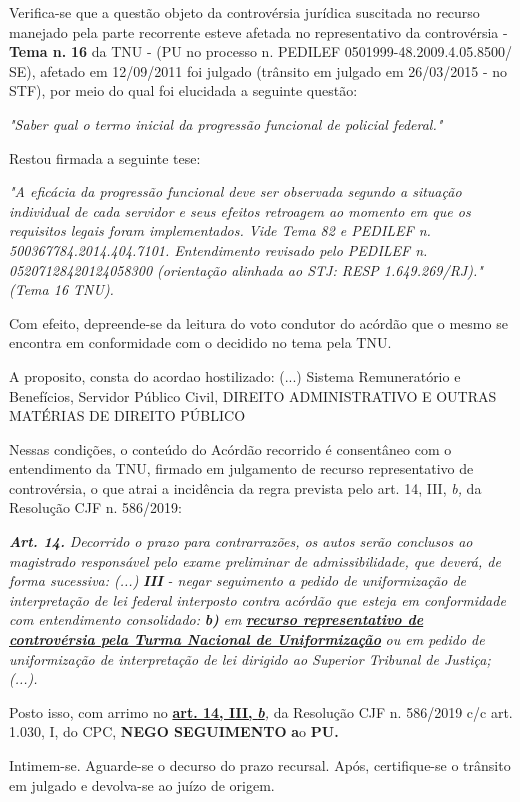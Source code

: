 \documentclass[12pt]{article}
\begin{document}
\justifying
\noindent Verifica-se que a questão objeto da controvérsia jurídica suscitada no recurso manejado pela parte recorrente esteve afetada no representativo da controvérsia - \textbf{Tema n. }\textbf{16} da TNU - (PU no processo n. PEDILEF 0501999-48.2009.4.05.8500/ SE),  afetado em 12/09/2011 foi julgado (trânsito em julgado em 26/03/2015 - no STF), por meio do qual foi elucidada a seguinte questão:

\noindent \textit{"Saber qual o termo inicial da progressão funcional de policial federal."}

\noindent Restou firmada a seguinte tese:

\noindent \textit{"A eficácia da progressão funcional deve ser observada segundo a situação individual de cada servidor e seus efeitos retroagem ao momento em que os requisitos legais foram implementados. Vide Tema 82 e PEDILEF n. 500367784.2014.404.7101. Entendimento revisado pelo PEDILEF n. 05207128420124058300 (orientação alinhada ao STJ: RESP 1.649.269/RJ)." (Tema 16 TNU).}

\noindent Com efeito, depreende-se da leitura do voto condutor do acórdão que o mesmo se encontra em conformidade com o decidido no  tema pela TNU.

\noindent A proposito, consta do acordao hostilizado: (...) Sistema Remuneratório e Benefícios, Servidor Público Civil, DIREITO ADMINISTRATIVO E OUTRAS MATÉRIAS DE DIREITO PÚBLICO

\noindent Nessas condições, o conteúdo do Acórdão recorrido é consentâneo com o entendimento da TNU, firmado em julgamento de recurso representativo de controvérsia, o que atrai a incidência da regra prevista pelo art. 14, III, \textit{b,} da Resolução CJF n. 586/2019:

\noindent \textit{\textbf{Art. 14.}}\textit{ Decorrido o prazo para contrarrazões, os autos serão conclusos ao magistrado responsável pelo exame preliminar de admissibilidade, que deverá, de forma sucessiva: (...) }\textit{\textbf{III }}\textit{- negar seguimento a pedido de uniformização de interpretação de lei federal interposto contra acórdão que esteja em conformidade com entendimento consolidado: }\textit{\textbf{b)}}\textit{ em }\uline{\textit{\textbf{recurso representativo de controvérsia pela Turma Nacional de Uniformização}}}\textit{ ou em pedido de uniformização de interpretação de lei dirigido ao Superior Tribunal de Justiça;(...).}

\noindent Posto isso, com arrimo no \uline{\textbf{art. 14, III, }}\uline{\textit{\textbf{b}}}\textit{,} da Resolução CJF n. 586/2019 c/c art. 1.030, I, do CPC, \textbf{NEGO SEGUIMENTO }\textbf{a}o\textbf{ PU}\textbf{.}

\noindent Intimem-se. Aguarde-se o decurso do prazo recursal. Após, certifique-se o trânsito em julgado e devolva-se ao juízo de origem.
\end{document}
